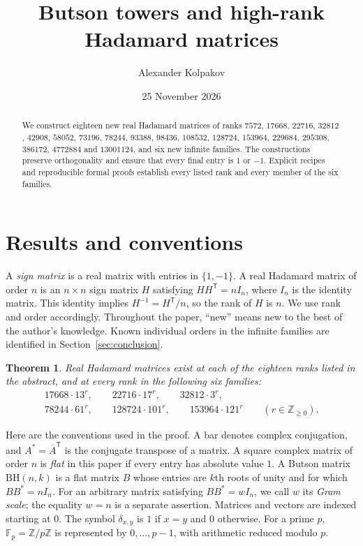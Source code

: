 \documentclass[10pt]{article}
\title{Butson towers and high-rank Hadamard matrices}
\author{Alexander Kolpakov}
\date{25 November 2026}
\newtheorem{theorem}{Theorem}
\newcommand{\F}{\mathbb F}
\begin{document}
\maketitle

\begin{abstract}
We construct eighteen new real Hadamard matrices of ranks
$7572$, $17668$, $22716$, $32812$, $42908$, $58052$, $73196$, $78244$,
$93388$, $98436$, $108532$, $128724$, $153964$, $229684$, $295308$,
$386172$, $4772884$ and $13001124$, and six new infinite families.
The constructions preserve orthogonality and ensure that every final entry
is $1$ or $-1$. Explicit recipes and reproducible formal proofs establish
every listed rank and every member of the six families.
\end{abstract}

\section{Results and conventions}

A \emph{sign matrix} is a real matrix with entries in $\{1,-1\}$.
A real Hadamard matrix of order $n$ is an $n\times n$ sign matrix $H$
satisfying $HH^{\mathsf T}=nI_n$, where $I_n$ is the identity matrix.
This identity implies $H^{-1}=H^{\mathsf T}/n$, so the rank of $H$ is $n$.
We use rank and order accordingly. Throughout the paper, ``new'' means
new to the best of the author's knowledge. Known individual orders in the
infinite families are identified in Section~\ref{sec:conclusion}.

\begin{theorem}\label{thm:main}
Real Hadamard matrices exist at each of the eighteen ranks listed in the
abstract, and at every rank in the following six families:
\[
\begin{gathered}
17668\cdot13^r,\qquad22716\cdot17^r,\qquad32812\cdot3^r,\\
78244\cdot61^r,\qquad128724\cdot101^r,\qquad153964\cdot121^r
\qquad(r\in\mathbb Z_{\geq0}).
\end{gathered}
\]
\end{theorem}

Here are the conventions used in the proof. A bar denotes complex
conjugation, and $A^*=\overline A^{\mathsf T}$ is the conjugate transpose
of a matrix. A square complex matrix of order $n$ is \emph{flat} in this
paper if every entry has absolute value $1$. A Butson matrix
$\mathrm{BH}(n,k)$ is a flat matrix $B$ whose entries are $k$th roots of
unity and for which $BB^*=nI_n$.
For an arbitrary matrix satisfying $BB^*=wI_n$, we call $w$ its
\emph{Gram scale}; the equality $w=n$ is a separate assertion.
Matrices and vectors are indexed starting at $0$.
The symbol $\delta_{x,y}$ is $1$ if $x=y$ and $0$ otherwise.
For a prime $p$, $\F_p=\mathbb Z/p\mathbb Z$ is represented by
$0,\ldots,p-1$, with arithmetic reduced modulo $p$.
\end{document}

